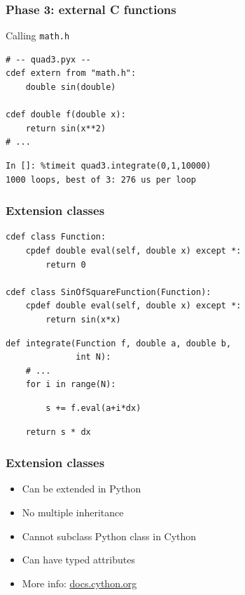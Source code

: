 \documentclass[14pt,compress]{beamer}
\newcounter{time}
\newcommand{\typ}[1]{\lstinline{#1}}
\begin{document}
\begin{frame}[fragile]
    \frametitle{Phase 3: external C functions}
    Calling \typ{math.h}
\begin{lstlisting}
# -- quad3.pyx --
cdef extern from "math.h":
    double sin(double)

cdef double f(double x):
    return sin(x**2)
# ...
\end{lstlisting}

\begin{lstlisting}
In []: %timeit quad3.integrate(0,1,10000)
1000 loops, best of 3: 276 us per loop
\end{lstlisting}
\end{frame}


\begin{frame}[fragile]
    \frametitle{Extension classes}
    \small
\begin{lstlisting}
cdef class Function:
    cpdef double eval(self, double x) except *:
        return 0

cdef class SinOfSquareFunction(Function):
    cpdef double eval(self, double x) except *:
        return sin(x*x)

\end{lstlisting}
\pause
\begin{lstlisting}
def integrate(Function f, double a, double b, 
              int N):
    # ...
    for i in range(N):
\end{lstlisting}
\vspace*{-1em}
\begin{lstlisting}
        s += f.eval(a+i*dx)
\end{lstlisting}
\vspace*{-1em}
\begin{lstlisting}
    return s * dx
\end{lstlisting}
\end{frame}

\begin{frame}
    \frametitle{Extension classes}
    \begin{itemize}
        \item Can be extended in Python
        \item No multiple inheritance
        \item Cannot subclass Python class in Cython
        \item Can have typed attributes
        \item More info: \url{docs.cython.org}
    \end{itemize}
\end{frame}
\end{document}
